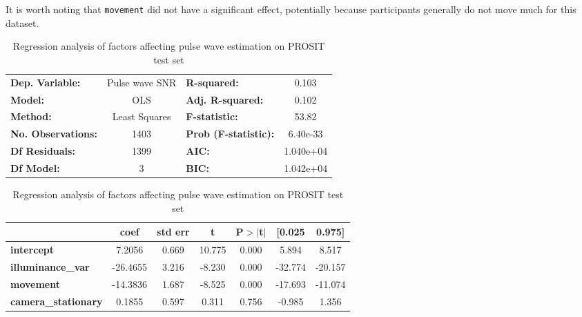 \documentclass{article}
\begin{document}
It is worth noting that \texttt{movement} did not have a significant effect, potentially because participants generally do not move much for this dataset.

\begin{table}[h!]
\begin{center}
\caption{Regression analysis of factors affecting pulse wave estimation on PROSIT test set}
\label{tab:vv-hr-regression-prosit}
\begin{tabular}{lclc}
\toprule
\textbf{Dep. Variable:}          &  Pulse wave SNR  & \textbf{  R-squared:         } &     0.103   \\
\textbf{Model:}                  &       OLS        & \textbf{  Adj. R-squared:    } &     0.102   \\
\textbf{Method:}                 &  Least Squares   & \textbf{  F-statistic:       } &     53.82   \\
\textbf{No. Observations:}       &        1403      & \textbf{  Prob (F-statistic):} &  6.40e-33   \\
\textbf{Df Residuals:}           &        1399      & \textbf{  AIC:               } & 1.040e+04   \\
\textbf{Df Model:}               &           3      & \textbf{  BIC:               } & 1.042e+04   \\
\bottomrule
\end{tabular}
\begin{tabular}{lcccccc}
                                 & \textbf{coef} & \textbf{std err} & \textbf{t} & \textbf{P$> |$t$|$} & \textbf{[0.025} & \textbf{0.975]}  \\
\midrule
\textbf{intercept}               &       7.2056  &        0.669     &    10.775  &         0.000        &        5.894    &        8.517     \\
\textbf{illuminance\_var} 		 &     -26.4655  &        3.216     &    -8.230  &         0.000        &      -32.774    &      -20.157     \\
\textbf{movement}       			 &     -14.3836  &        1.687     &    -8.525  &         0.000        &      -17.693    &      -11.074     \\
\textbf{camera\_stationary}   	 &       0.1855  &        0.597     &     0.311  &         0.756        &       -0.985    &        1.356     \\
\bottomrule
\end{tabular}
\end{center}
\end{table}
\end{document}
